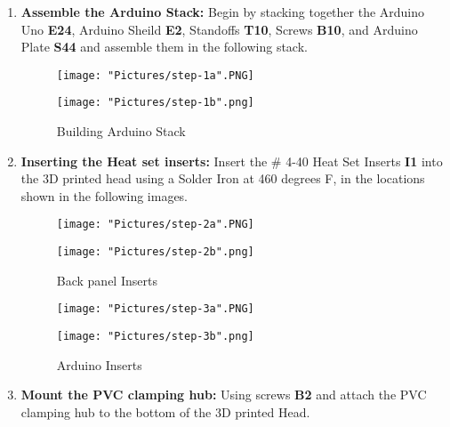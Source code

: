 \documentclass[12pt]{article}
\begin{document}
\begin{enumerate}

\item \textbf{Assemble the Arduino Stack:} Begin by stacking together the Arduino Uno \textbf{E24}, Arduino Sheild \textbf{E2}, Standoffs \textbf{T10}, Screws \textbf{B10}, and Arduino Plate \textbf{S44} and assemble them in the following stack. 

\begin{figure}[H]
	\centering
  	\begin{minipage}[b]{0.45\textwidth}
		\texttt{[image: "Pictures/step-1a".PNG]}
  	\end{minipage}
  	\hfill
  	\begin{minipage}[b]{0.45\textwidth}
    		\texttt{[image: "Pictures/step-1b".png]}
  	\end{minipage}
  	\caption{Building Arduino Stack}
\end{figure}


\item \textbf{Inserting the Heat set inserts:} Insert the \# 4-40 Heat Set Inserts \textbf{I1} into the 3D printed head using a Solder Iron at 460 degrees F, in the locations shown in the following images.

\begin{figure}[H]
	\centering
  	\begin{minipage}[b]{0.45\textwidth}
		\texttt{[image: "Pictures/step-2a".PNG]}
  	\end{minipage}
  	\hfill
  	\begin{minipage}[b]{0.45\textwidth}
    		\texttt{[image: "Pictures/step-2b".png]}
  	\end{minipage}
  	\caption{Back panel Inserts}
\end{figure}

\begin{figure}[H]
	\centering
  	\begin{minipage}[b]{0.45\textwidth}
		\texttt{[image: "Pictures/step-3a".PNG]}
  	\end{minipage}
  	\hfill
  	\begin{minipage}[b]{0.45\textwidth}
    		\texttt{[image: "Pictures/step-3b".png]}
  	\end{minipage}
  	\caption{Arduino Inserts}
\end{figure}

\item \textbf{Mount the PVC clamping hub:} Using screws \textbf{B2} and attach the PVC clamping hub to the bottom of the 3D printed Head. 


\end{enumerate}
\end{document}
